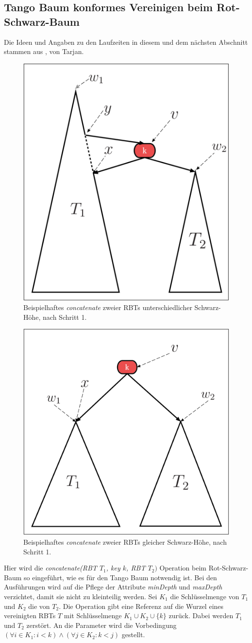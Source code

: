 \documentclass[a4paper,12pt]{article}
\begin{document}
\subsection{Tango Baum konformes Vereinigen beim Rot-Schwarz-Baum} \label{vereinigen}
Die Ideen und Angaben zu den Laufzeiten in diesem und dem nächsten Abschnitt stammen aus \cite{conSplit}, von Tarjan.
\begin{figure}[H]
	\centering
	\includegraphics[height= 0.6\textwidth]{"Medien/RotSchwarzBaum/vereinigen"}
	\caption{Beispielhaftes \textit{concatenate} zweier RBTs unterschiedlicher Schwarz-Höhe, nach Schritt 1. }
	\label{fig:vereinigen}
\end{figure}
\begin{figure}[H]
	\centering
	\includegraphics[height= 0.6\textwidth]{"Medien/RotSchwarzBaum/vereinigen2"}
	\caption{Beispielhaftes \textit{concatenate} zweier RBTs gleicher Schwarz-Höhe, nach Schritt 1. }
	\label{fig:vereinigen2}
\end{figure}
\noindent Hier wird die \textit{concatenate(RBT $T_1$, key $k$, RBT $T_2)$} Operation beim Rot-Schwarz-Baum so eingeführt, wie es für den Tango Baum notwendig ist. Bei den Ausführungen wird auf die Pflege der Attribute  \textit{minDepth} und \textit{maxDepth} verzichtet, damit sie nicht zu kleinteilig werden. Sei $K_1$ die Schlüsselmenge von $T_1$ und $K_2$ die von $T_2$. Die Operation gibt eine Referenz auf die Wurzel eines vereinigten RBTs $T$ mit Schlüsselmenge $K_1 \cup K_2 \cup \{k\} $ zurück. Dabei werden $T_1$ und $T_2$ zerstört. An die Parameter wird die Vorbedingung $(\forall i \in K_1: i < k ) \land (\forall j \in K_2: k < j )$ gestellt.\\
\end{document}
